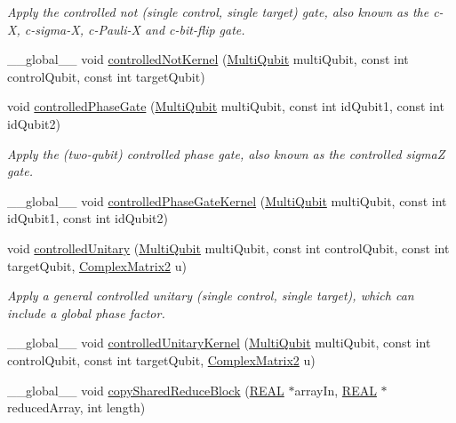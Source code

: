 \begin{DoxyCompactItemize}
\begin{DoxyCompactList}\small\item\em Apply the controlled not (single control, single target) gate, also known as the c-\/X, c-\/sigma-\/X, c-\/\+Pauli-\/X and c-\/bit-\/flip gate. \end{DoxyCompactList}\item 
\+\_\+\+\_\+global\+\_\+\+\_\+ void \mbox{\hyperlink{QuEST__env__localGPU_8cu_a625723cfbffdde3b3b312f8573d530a3}{controlled\+Not\+Kernel}} (\mbox{\hyperlink{structMultiQubit}{Multi\+Qubit}} multi\+Qubit, const int control\+Qubit, const int target\+Qubit)
\item 
void \mbox{\hyperlink{QuEST__env__localGPU_8cu_a11a96159191cbf1b01a1080e7f045aac}{controlled\+Phase\+Gate}} (\mbox{\hyperlink{structMultiQubit}{Multi\+Qubit}} multi\+Qubit, const int id\+Qubit1, const int id\+Qubit2)
\begin{DoxyCompactList}\small\item\em Apply the (two-\/qubit) controlled phase gate, also known as the controlled sigmaZ gate. \end{DoxyCompactList}\item 
\+\_\+\+\_\+global\+\_\+\+\_\+ void \mbox{\hyperlink{QuEST__env__localGPU_8cu_a67313a10fc0760b39a5ce9ef1d505830}{controlled\+Phase\+Gate\+Kernel}} (\mbox{\hyperlink{structMultiQubit}{Multi\+Qubit}} multi\+Qubit, const int id\+Qubit1, const int id\+Qubit2)
\item 
void \mbox{\hyperlink{QuEST__env__localGPU_8cu_a8a701526263392599aa21d0d0f05d9d8}{controlled\+Unitary}} (\mbox{\hyperlink{structMultiQubit}{Multi\+Qubit}} multi\+Qubit, const int control\+Qubit, const int target\+Qubit, \mbox{\hyperlink{structComplexMatrix2}{Complex\+Matrix2}} u)
\begin{DoxyCompactList}\small\item\em Apply a general controlled unitary (single control, single target), which can include a global phase factor. \end{DoxyCompactList}\item 
\+\_\+\+\_\+global\+\_\+\+\_\+ void \mbox{\hyperlink{QuEST__env__localGPU_8cu_a8e75679cf6d66e11507ee227ab584473}{controlled\+Unitary\+Kernel}} (\mbox{\hyperlink{structMultiQubit}{Multi\+Qubit}} multi\+Qubit, const int control\+Qubit, const int target\+Qubit, \mbox{\hyperlink{structComplexMatrix2}{Complex\+Matrix2}} u)
\item 
\+\_\+\+\_\+global\+\_\+\+\_\+ void \mbox{\hyperlink{QuEST__env__localGPU_8cu_a250e9d66ad94ed2682e76a3c7502c8e1}{copy\+Shared\+Reduce\+Block}} (\mbox{\hyperlink{QuEST__precision_8h_a4b654506f18b8bfd61ad2a29a7e38c25}{R\+E\+AL}} $\ast$array\+In, \mbox{\hyperlink{QuEST__precision_8h_a4b654506f18b8bfd61ad2a29a7e38c25}{R\+E\+AL}} $\ast$reduced\+Array, int length)

\end{DoxyCompactItemize}
